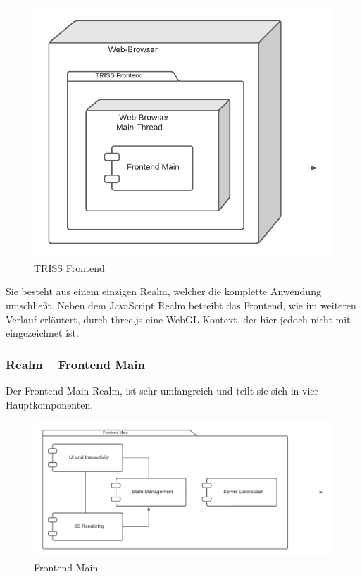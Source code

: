 \begin{figure}[htb]
    \centering
    \includegraphics[scale=.65,center]{medien/triss-frontend.pdf}
    \caption{TRISS Frontend}
    \ownsource
    \label{fig:triss-frontend}
\end{figure}

\FloatBarrier

Sie besteht aus einem einzigen Realm, welcher die komplette Anwendung umschließt.
Neben dem JavaScript Realm betreibt das Frontend, wie im weiteren Verlauf erläutert, durch three.js eine WebGL Kontext, der hier jedoch nicht mit eingezeichnet ist.

\subsubsection{Realm – Frontend Main}

Der Frontend Main Realm, ist sehr umfangreich und teilt sie sich in vier Hauptkomponenten.

\begin{figure}[htb]
    \centering
    \includegraphics[scale=.65,center]{medien/frontend-main.pdf}
    \caption{Frontend Main}
    \ownsource
    \label{fig:frontend-main}
\end{figure}

